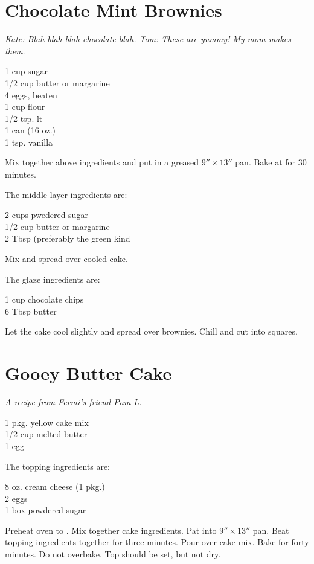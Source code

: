 \section{Chocolate Mint Brownies}

\textit{Kate: Blah blah blah chocolate blah.  Tom:  These are yummy!  My mom
makes them}.
\begin{ingredients}
1 cup sugar\\
1/2 cup butter or margarine\\
4 eggs, beaten\\
1 cup flour\\
1/2 tsp. lt\\
1 can  (16 oz.)\\
1 tsp. vanilla
\end{ingredients}
Mix together above ingredients and put in a greased $9''\times 13''$ pan. 
Bake at  for 30 minutes.

The middle layer ingredients are:
\begin{ingredients}
2 cups pwedered sugar\\
1/2 cup butter or margarine\\
2 Tbsp  (preferably the green kind
\end{ingredients}
Mix and spread over cooled cake.

The glaze ingredients are:
\begin{ingredients}
1 cup chocolate chips\\
6 Tbsp butter
\end{ingredients}
Let the cake cool slightly and spread over brownies.  Chill and cut into
squares.

\section{Gooey Butter Cake}

\textit{A recipe from Fermi's friend Pam L.}
\begin{ingredients}
1 pkg. yellow cake mix\\
1/2 cup melted butter\\
1 egg
\end{ingredients}
The topping ingredients are:
\begin{ingredients}
8 oz. cream cheese (1 pkg.)\\
2 eggs\\
1 box powdered sugar
\end{ingredients}
Preheat oven to .  Mix together cake ingredients.  Pat into
$9''\times 13''$ pan.  Beat topping ingredients together for three minutes.
Pour over cake mix.  Bake for forty minutes.  Do not overbake. Top should be 
set, but not dry.

